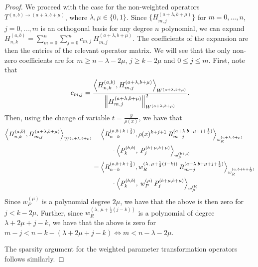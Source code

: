 \documentclass[11pt, oneside]{article}   	%
\newcommand{\half}{\frac{1}{2}}
\newcommand{\hdop}{H}
\newcommand{\hdopnkab}{\hdop_{n,k}^{(a,b)}}
\newcommand{\genjac}{R}
\newcommand{\genjacnmk}{\genjac_{n-k}}
\newcommand{\genjacmmj}{\genjac_{m-j}}
\newcommand{\genjacw}{w_\genjac}
\begin{document}
\begin{proof}
We proceed with the case for the non-weighted operators $T^{(a,b)\to(a+\lambda,b+\mu)}$, where $\lambda, \mu \in \{0,1\}$. Since $\{\hdop^{(a+\lambda, b+\mu)}_{m,j}\}$ for $m = 0,\dots,n$, $j = 0,\dots,m$ is an orthogonal basis for any degree $n$ polynomial, we can expand $\hdopnkab = \sum_{m=0}^{n} \sum_{j=0}^m c_{m,j} \: \hdop^{(a+\lambda, b+\mu)}_{m,j}$. The coefficients of the expansion are then the entries of the relevant operator matrix. We will see that the only non-zero coefficients are for $m \ge n - \lambda - 2\mu $, $j \ge k-2\mu$ and $0 \le j \le m$. First, note that
\begin{align*}
	c_{m,j} = \frac{\ip< \hdopnkab, \hdop^{(a+\lambda, b+\mu)}_{m,j} >_{W^{(a+\lambda, b+\mu)}}}{\norm{\hdop^{(a+\lambda, b+\mu)}_{m,j}}^2_{W^{(a+\lambda, b+\mu)}}}.
\end{align*}
Then, using the change of variable $t = \frac{y}{\rho(x)}$, we have that
\begin{align*}
	\ip< \hdopnkab, \hdop^{(a+\lambda, b+\mu)}_{m,j} >_{W^{(a+\lambda, b+\mu)}} &= \ip< \genjacnmk^{(a,b+k+\half)}, \rho(x)^{k+j+1} \: \genjacmmj^{(a+\lambda,b+\mu+j+\half)} >_{\genjacw^{(a+\lambda,b+\mu)}} \\ 
	&\quad \quad \quad \cdot \ip< P_k^{(b,b)}, \: P_{j}^{(b+\mu,b+\mu)} >_{w_P^{(b+\mu)}} \\
	&= \ip< \genjacnmk^{(a,b+k+\half)}, \genjacw^{(\lambda, \: \mu+\half(j-k))} \: \genjacmmj^{(a+\lambda,b+\mu+j+\half)} >_{\genjacw^{(a,b+k+\half)}} \\
	&\quad \quad \quad \cdot \ip< P_k^{(b,b)}, \: w_P^{(\mu)} \: P_{j}^{(b+\mu,b+\mu)} >_{w_P^{(b)}}
\end{align*}
Since $w_P^{(\mu)}$ is a polynomial degree $2\mu$, we have that the above is then zero for $j < k-2\mu$. Further, since $\genjacw^{(\lambda, \: \mu+\half(j-k))}$ is a polynomial of degree $\lambda + 2\mu + j - k$, we have that the above is zero for $m-j < n-k - (\lambda + 2\mu + j - k) \iff m < n - \lambda - 2\mu$.

The sparsity argument for the weighted parameter transformation operators follows similarly.
\end{proof}
\end{document}
